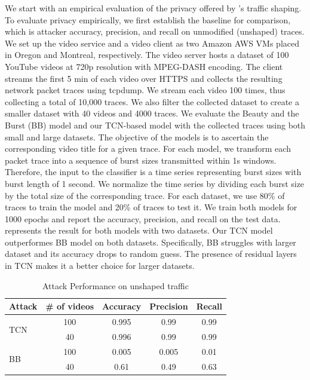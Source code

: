 We start with an empirical evaluation of the privacy offered by {\sys}'s traffic
shaping.
To evaluate privacy empirically, we first establish the baseline for comparison, which is attacker accuracy, precision, and recall on unmodified (\ie unshaped) traces.
We set up the video service and a video client as two Amazon AWS VMs placed in Oregon and Montreal, respectively.
The video server hosts a dataset of 100 YouTube videos at 720p resolution with MPEG-DASH encoding.
The client streams the first 5 min of each video over HTTPS and collects the resulting network packet traces using tcpdump.
We stream each video 100 times, thus collecting a total of 10,000 traces.
We also filter the collected dataset to create a smaller dataset with 40 videos and 4000 traces.
We evaluate the Beauty and the Burst (BB) model and our TCN-based model with the collected traces using both small and large datasets.
The objective of the models is to ascertain the corresponding video title for a given trace. 
For each model, we transform each packet trace into a sequence of burst sizes
transmitted within 1s windows.
Therefore, the input to the classifier is a time series representing burst sizes with burst length of 1 second.
We normalize the time series by dividing each burst size by the total size of the corresponding trace.
For each dataset, we use 80\% of traces to train the model and 20\% of traces to test it. 
We train both models for 1000 epochs and report the accuracy, precision, and recall on the test data.
 represents the result for both models with two datasets.
Our TCN model outperformes BB model on both datasets. 
Specifically, BB struggles with larger dataset and its accuracy drops to random guess. 
The presence of residual layers in TCN makes it a better choice for larger datasets.
\begin{table}[h]
  \centering
  \caption{Attack Performance on unshaped traffic}
  \begin{tabular}{|l|c|c|c|c|}
    \hline
    \textbf{Attack} & \textbf{\# of videos} & \textbf{Accuracy} & \textbf{Precision} & \textbf{Recall} \\ 
    \hline
    \multirow{2}{*}{TCN} & 100 & 0.995 & 0.99 & 0.99 \\ 
                         & 40  & 0.996 & 0.99 & 0.99 \\ 
    \hline
    \multirow{2}{*}{BB}  & 100 & 0.005  & 0.005 & 0.01 \\ 
                         & 40  & 0.61  & 0.49 & 0.63 \\ 
    \hline
  \end{tabular}\label{tab:attack-performance}
\end{table}


